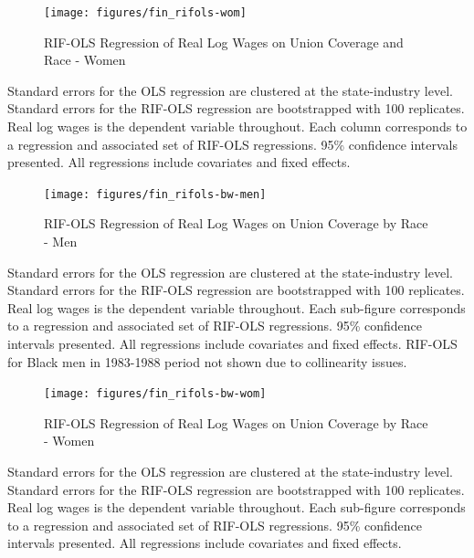 \documentclass[11pt]{article}
\begin{document}
{\pagebreak
\begin{landscape}
\begin{figure}[ht!]
\centering
    \caption{RIF-OLS Regression of Real Log Wages on Union Coverage and Race - Women}\label{fig:rifols-wom}
    \texttt{[image: figures/fin\_rifols-wom]}
\end{figure}
\footnotesize{Standard errors for the OLS regression are clustered at the state-industry level. Standard errors for the RIF-OLS regression are bootstrapped with 100 replicates. Real log wages is the dependent variable throughout. Each column corresponds to a regression and associated set of RIF-OLS regressions. 95\% confidence intervals presented. All regressions include covariates and fixed effects.}
\end{landscape}

\pagebreak
\begin{landscape}
\begin{figure}[ht!]
\centering
    \caption{RIF-OLS Regression of Real Log Wages on Union Coverage by Race - Men}\label{fig:rifols-bw-men}
    \texttt{[image: figures/fin\_rifols-bw-men]}
\end{figure}
\footnotesize{Standard errors for the OLS regression are clustered at the state-industry level. Standard errors for the RIF-OLS regression are bootstrapped with 100 replicates. Real log wages is the dependent variable throughout. Each sub-figure corresponds to a regression and associated set of RIF-OLS regressions. 95\% confidence intervals presented. All regressions include covariates and fixed effects. RIF-OLS for Black men in 1983-1988 period not shown due to collinearity issues.}
\end{landscape}

\pagebreak
\begin{landscape}
\begin{figure}[ht!]
\centering
    \caption{RIF-OLS Regression of Real Log Wages on Union Coverage by Race - Women}\label{fig:rifols-bw-wom}
    \texttt{[image: figures/fin\_rifols-bw-wom]}
\end{figure}
\footnotesize{Standard errors for the OLS regression are clustered at the state-industry level. Standard errors for the RIF-OLS regression are bootstrapped with 100 replicates. Real log wages is the dependent variable throughout. Each sub-figure corresponds to a regression and associated set of RIF-OLS regressions. 95\% confidence intervals presented. All regressions include covariates and fixed effects.}
\end{landscape}

}
\end{document}
